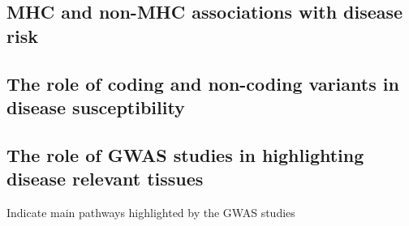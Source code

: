 {\subsection{MHC and non-MHC associations with disease risk}

\subsection{The role of coding and non-coding variants in disease susceptibility}

\subsection{The role of GWAS studies in highlighting disease relevant tissues}
Indicate main pathways highlighted by the GWAS studies



}
